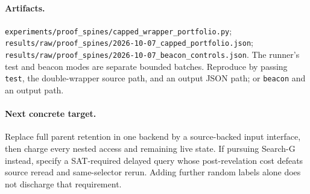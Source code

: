 \documentclass[11pt]{article}
\begin{document}
\paragraph{Artifacts.}
\texttt{experiments/proof\_spines/capped\_wrapper\_portfolio.py};
\texttt{results/raw/proof\_spines/2026-10-07\_capped\_portfolio.json};
\texttt{results/raw/proof\_spines/2026-10-07\_beacon\_controls.json}.
The runner's test and beacon modes are separate bounded batches. Reproduce by
passing \texttt{test}, the double-wrapper source path, and an output JSON path;
or \texttt{beacon} and an output path.

\paragraph{Next concrete target.}
Replace full parent retention in one backend by a source-backed input interface,
then charge every nested access and remaining live state. If pursuing Search-G
instead, specify a SAT-required delayed query whose post-revelation cost defeats
source reread and same-selector rerun. Adding further random labels alone does
not discharge that requirement.
\end{document}
